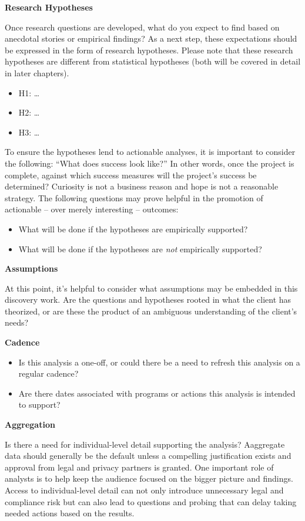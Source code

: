 \documentclass[
]{book}
\providecommand{\tightlist}{%
  \setlength{\itemsep}{0pt}\setlength{\parskip}{0pt}}
\begin{document}
\textbf{Research Hypotheses}

Once research questions are developed, what do you expect to find based on anecdotal stories or empirical findings? As a next step, these expectations should be expressed in the form of research hypotheses. Please note that these research hypotheses are different from statistical hypotheses (both will be covered in detail in later chapters).

\begin{itemize}
\tightlist
\item
  H1: \ldots{}
\item
  H2: \ldots{}
\item
  H3: \ldots{}
\end{itemize}

To ensure the hypotheses lend to actionable analyses, it is important to consider the following: ``What does success look like?'' In other words, once the project is complete, against which success measures will the project's success be determined? Curiosity is not a business reason and hope is not a reasonable strategy. The following questions may prove helpful in the promotion of actionable -- over merely interesting -- outcomes:

\begin{itemize}
\tightlist
\item
  What will be done if the hypotheses are empirically supported?
\item
  What will be done if the hypotheses are \emph{not} empirically supported?
\end{itemize}

\textbf{Assumptions}

At this point, it's helpful to consider what assumptions may be embedded in this discovery work. Are the questions and hypotheses rooted in what the client has theorized, or are these the product of an ambiguous understanding of the client's needs?

\textbf{Cadence}

\begin{itemize}
\tightlist
\item
  Is this analysis a one-off, or could there be a need to refresh this analysis on a regular cadence?
\item
  Are there dates associated with programs or actions this analysis is intended to support?
\end{itemize}

\textbf{Aggregation}

Is there a need for individual-level detail supporting the analysis? Aaggregate data should generally be the default unless a compelling justification exists and approval from legal and privacy partners is granted. One important role of analysts is to help keep the audience focused on the bigger picture and findings. Access to individual-level detail can not only introduce unnecessary legal and compliance risk but can also lead to questions and probing that can delay taking needed actions based on the results.
\end{document}
